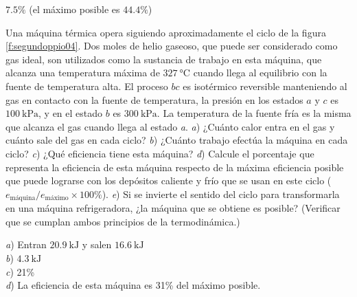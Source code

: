 \begin{Answer}
	\begin{minipage}[t]{.4\textwidth}
    $7.5\%$ (el máximo posible es $44.4\%$)
  \end{minipage}
\end{Answer}
%
\begin{Exercise}\label{p:segundoppio04}
  Una máquina térmica opera siguiendo aproximadamente el ciclo de la figura \ref{f:segundoppio04}. Dos moles de helio gaseoso, que puede ser considerado como gas ideal, son utilizados como la sustancia de trabajo en esta máquina, que alcanza una temperatura máxima de $\SI{327}{\celsius}$ cuando llega al equilibrio con la fuente de temperatura alta. El proceso $bc$ es isotérmico reversible manteniendo al gas en contacto con la fuente de temperatura, la presión en los estados $a$ y $c$ es $\SI{100}{\kilo\pascal}$, y en el estado $b$ es $\SI{300}{\kilo\pascal}$. La temperatura de la fuente fría es la misma que alcanza el gas cuando llega al estado \textit{a}. \textit{a}) ¿Cuánto calor entra en el gas y cuánto sale del gas en cada ciclo? \textit{b}) ¿Cuánto trabajo efectúa la máquina en cada ciclo? \textit{c}) ¿Qué eficiencia tiene esta máquina? \textit{d}) Calcule el porcentaje que representa la eficiencia de esta máquina respecto de la máxima eficiencia posible que puede lograrse con los depósitos caliente y frío que se usan en este ciclo ($e_\text{máquina}/e_\text{máximo}\times 100\%$). \textit{e}) Si se invierte el sentido del ciclo para transformarla en una máquina refrigeradora, ¿la máquina que se obtiene es posible? (Verificar que se cumplan ambos principios de la termodinámica.)
\end{Exercise}
\begin{Answer}
	\begin{minipage}[t]{.4\textwidth}
    \textit{a}) Entran $\SI{20.9}{\kilo\joule}$ y salen $\SI{16.6}{\kilo\joule}$\\ \textit{b}) $\SI{4.3}{\kilo\joule}$\\ \textit{c}) 21\%\\ \textit{d}) La eficiencia de esta máquina es 31\% del máximo posible.
  \end{minipage}
\end{Answer}
%
